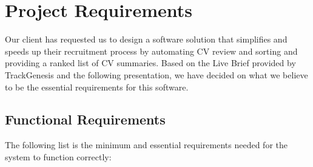 \chapter{Project Requirements}    
    Our client has requested us to design a software solution that simplifies and speeds up their recruitment process by automating CV review and sorting and providing a ranked list of CV summaries. Based on the Live Brief provided by TrackGenesis and the following presentation, we have decided on what we believe to be the essential requirements for this software. 

    \section{Functional Requirements}
        The following list is the minimum and essential requirements needed for the system to function correctly:
